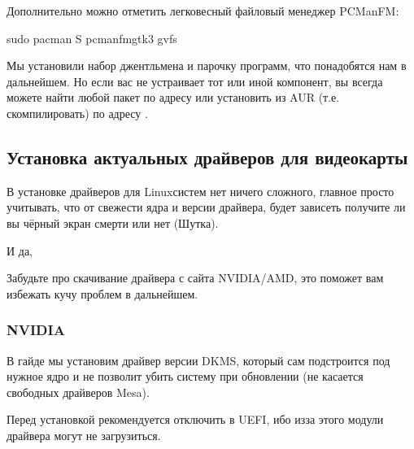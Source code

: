 \documentclass[letterpaper,10pt,russian,openany]{sphinxmanual}
\begin{document}
\sphinxAtStartPar
Дополнительно можно отметить легковесный файловый менеджер PCManFM:

\begin{sphinxVerbatim}[commandchars=\\\{\}]
sudo pacman \PYGZhy{}S pcmanfm\PYGZhy{}gtk3 gvfs
\end{sphinxVerbatim}

\sphinxAtStartPar
Мы установили набор джентльмена и парочку программ, что понадобятся нам в дальнейшем.
Но если вас не устраивает тот или иной компонент, вы всегда можете найти любой пакет по адресу 
или установить из AUR (т.е. скомпилировать) по адресу .

\ignorespaces 

\subsection{Установка актуальных драйверов для видеокарты}
\label{\detokenize{source/first-steps:drivers-installation}}\label{\detokenize{source/first-steps:index-5}}\label{\detokenize{source/first-steps:id5}}
\sphinxAtStartPar
В установке драйверов для Linux\sphinxhyphen{}систем нет ничего сложного, главное просто учитывать, что от свежести ядра и версии драйвера,
будет зависеть получите ли вы чёрный экран смерти или нет (Шутка).

\sphinxAtStartPar
И да, 

\sphinxAtStartPar
Забудьте про скачивание драйвера с сайта NVIDIA/AMD, это поможет вам избежать кучу проблем в дальнейшем.


\subsubsection{NVIDIA}
\label{\detokenize{source/first-steps:nvidia}}
\sphinxAtStartPar
В гайде мы установим драйвер версии DKMS, который сам подстроится под нужное ядро и не позволит убить систему при обновлении
(не касается свободных драйверов Mesa).

\sphinxAtStartPar
Перед установкой рекомендуется отключить  в UEFI, ибо из\sphinxhyphen{}за этого модули драйвера могут не загрузиться.
\end{document}
